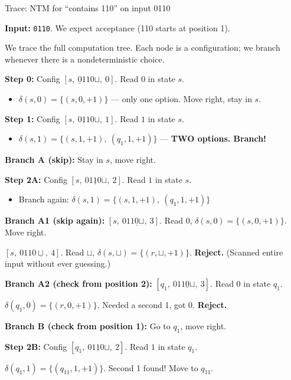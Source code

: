 \documentclass[11pt,a4paper]{article}
\begin{document}
\begin{examplebox}{{Trace: NTM for ``contains 110'' on input 0110}}

\textbf{Input:} \texttt{0110}. We expect acceptance (110 starts at position 1).

We trace the full computation tree. Each node is a configuration; we branch whenever there is a nondeterministic choice.

\textbf{Step 0:} Config $[s,\ \underline{0}110\sqcup,\ 0]$. Read $0$ in state $s$.
\begin{itemize}[nosep]
\item $\delta(s, 0) = \{(s, 0, +1)\}$ --- only one option. Move right, stay in $s$.
\end{itemize}

\textbf{Step 1:} Config $[s,\ 0\underline{1}10\sqcup,\ 1]$. Read $1$ in state $s$.
\begin{itemize}[nosep]
\item $\delta(s, 1) = \{(s, 1, +1),\ (q_1, 1, +1)\}$ --- \textbf{TWO options. Branch!}
\end{itemize}

\textbf{Branch A (skip):} Stay in $s$, move right.

\quad \textbf{Step 2A:} Config $[s,\ 01\underline{1}0\sqcup,\ 2]$. Read $1$ in state $s$.
\begin{itemize}[nosep]
\item Branch again: $\delta(s, 1) = \{(s, 1, +1),\ (q_1, 1, +1)\}$
\end{itemize}

\quad \textbf{Branch A1 (skip again):} $[s,\ 011\underline{0}\sqcup,\ 3]$. Read $0$, $\delta(s,0) = \{(s,0,+1)\}$. Move right.

\quad\quad $[s,\ 0110\underline{\sqcup},\ 4]$. Read $\sqcup$, $\delta(s, \sqcup) = \{(r, \sqcup, +1)\}$. \textbf{Reject.} (Scanned entire input without ever guessing.)

\quad \textbf{Branch A2 (check from position 2):} $[q_1,\ 011\underline{0}\sqcup,\ 3]$. Read $0$ in state $q_1$.

\quad\quad $\delta(q_1, 0) = \{(r, 0, +1)\}$. Needed a second 1, got 0. \textbf{Reject.}

\textbf{Branch B (check from position 1):} Go to $q_1$, move right.

\quad \textbf{Step 2B:} Config $[q_1,\ 01\underline{1}0\sqcup,\ 2]$. Read $1$ in state $q_1$.

\quad $\delta(q_1, 1) = \{(q_{11}, 1, +1)\}$. Second 1 found! Move to $q_{11}$.


\end{examplebox}
\end{document}

